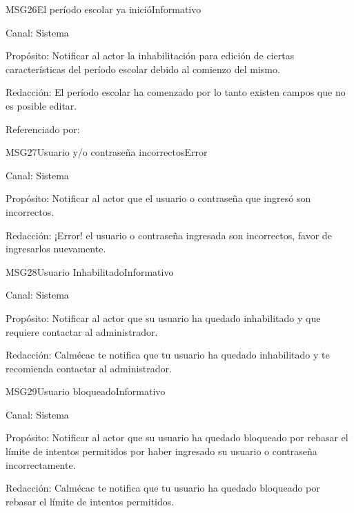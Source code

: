 \begin{mensaje}{MSG26}{El período escolar ya inició}{Informativo}
	\item[Canal:] Sistema
	\item[Propósito:] Notificar al actor la inhabilitación para edición de ciertas características del período escolar debido al comienzo del mismo.
	\item[Redacción:] El período escolar ha comenzado por lo tanto existen campos que no es posible editar.
	\item[Referenciado por: ]
\end{mensaje}

\begin{mensaje}{MSG27}{Usuario y/o contraseña incorrectos}{Error}
	\item[Canal:] Sistema
	\item[Propósito:] Notificar al actor que el usuario o contraseña que ingresó son incorrectos.
	\item[Redacción:] ¡Error! el usuario o contraseña ingresada son incorrectos, favor de ingresarlos nuevamente.
\end{mensaje}

\begin{mensaje}{MSG28}{Usuario Inhabilitado}{Informativo}
	\item[Canal:] Sistema
	\item[Propósito:] Notificar al actor que su usuario ha quedado inhabilitado y que requiere contactar al administrador.
	\item[Redacción:] Calmécac te notifica que tu usuario ha quedado inhabilitado y te recomienda contactar al administrador.
\end{mensaje}

\begin{mensaje}{MSG29}{Usuario bloqueado}{Informativo}
	\item[Canal:] Sistema
	\item[Propósito:] Notificar al actor que su usuario ha quedado bloqueado por rebasar el límite de intentos permitidos por haber ingresado su usuario o contraseña incorrectamente.
	\item[Redacción:] Calmécac te notifica que tu usuario ha quedado bloqueado por rebasar el límite de intentos permitidos.
\end{mensaje}

